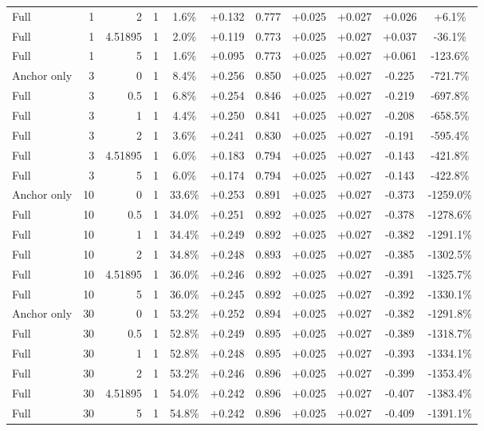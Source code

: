 \begin{table}[htbp]
\begin{tabular}{lrrrccccccc}
Full & 1 & 2 & 1 & 1.6\% & +0.132 & 0.777 & +0.025 & +0.027 & +0.026 & +6.1\% \\
Full & 1 & 4.51895 & 1 & 2.0\% & +0.119 & 0.773 & +0.025 & +0.027 & +0.037 & -36.1\% \\
Full & 1 & 5 & 1 & 1.6\% & +0.095 & 0.773 & +0.025 & +0.027 & +0.061 & -123.6\% \\
Anchor only & 3 & 0 & 1 & 8.4\% & +0.256 & 0.850 & +0.025 & +0.027 & -0.225 & -721.7\% \\
Full & 3 & 0.5 & 1 & 6.8\% & +0.254 & 0.846 & +0.025 & +0.027 & -0.219 & -697.8\% \\
Full & 3 & 1 & 1 & 4.4\% & +0.250 & 0.841 & +0.025 & +0.027 & -0.208 & -658.5\% \\
Full & 3 & 2 & 1 & 3.6\% & +0.241 & 0.830 & +0.025 & +0.027 & -0.191 & -595.4\% \\
Full & 3 & 4.51895 & 1 & 6.0\% & +0.183 & 0.794 & +0.025 & +0.027 & -0.143 & -421.8\% \\
Full & 3 & 5 & 1 & 6.0\% & +0.174 & 0.794 & +0.025 & +0.027 & -0.143 & -422.8\% \\
Anchor only & 10 & 0 & 1 & 33.6\% & +0.253 & 0.891 & +0.025 & +0.027 & -0.373 & -1259.0\% \\
Full & 10 & 0.5 & 1 & 34.0\% & +0.251 & 0.892 & +0.025 & +0.027 & -0.378 & -1278.6\% \\
Full & 10 & 1 & 1 & 34.4\% & +0.249 & 0.892 & +0.025 & +0.027 & -0.382 & -1291.1\% \\
Full & 10 & 2 & 1 & 34.8\% & +0.248 & 0.893 & +0.025 & +0.027 & -0.385 & -1302.5\% \\
Full & 10 & 4.51895 & 1 & 36.0\% & +0.246 & 0.892 & +0.025 & +0.027 & -0.391 & -1325.7\% \\
Full & 10 & 5 & 1 & 36.0\% & +0.245 & 0.892 & +0.025 & +0.027 & -0.392 & -1330.1\% \\
Anchor only & 30 & 0 & 1 & 53.2\% & +0.252 & 0.894 & +0.025 & +0.027 & -0.382 & -1291.8\% \\
Full & 30 & 0.5 & 1 & 52.8\% & +0.249 & 0.895 & +0.025 & +0.027 & -0.389 & -1318.7\% \\
Full & 30 & 1 & 1 & 52.8\% & +0.248 & 0.895 & +0.025 & +0.027 & -0.393 & -1334.1\% \\
Full & 30 & 2 & 1 & 53.2\% & +0.246 & 0.896 & +0.025 & +0.027 & -0.399 & -1353.4\% \\
Full & 30 & 4.51895 & 1 & 54.0\% & +0.242 & 0.896 & +0.025 & +0.027 & -0.407 & -1383.4\% \\
Full & 30 & 5 & 1 & 54.8\% & +0.242 & 0.896 & +0.025 & +0.027 & -0.409 & -1391.1\% \\

\end{tabular}
\end{table}
